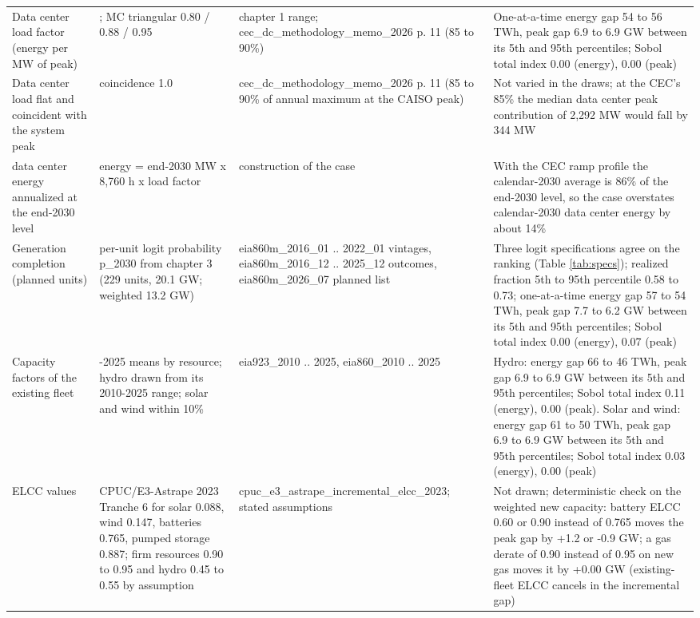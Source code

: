 \begin{longtable}{>{\raggedright\arraybackslash}p{2.3cm}>{\raggedright\arraybackslash}p{3.3cm}>{\raggedright\arraybackslash}p{2.8cm}>{\raggedright\arraybackslash}p{6.0cm}}
\addlinespace
Data center load factor (energy per MW of peak) & 0.88; MC triangular 0.80 / 0.88 / 0.95 & chapter 1 range; cec\_\allowbreak{}dc\_\allowbreak{}methodology\_\allowbreak{}memo\_\allowbreak{}2026 p. 11 (85 to 90\%) & One-at-a-time energy gap 54 to 56 TWh, peak gap 6.9 to 6.9 GW between its 5th and 95th percentiles; Sobol total index 0.00 (energy), 0.00 (peak) \\
\addlinespace
Data center load flat and coincident with the system peak & coincidence 1.0 & cec\_\allowbreak{}dc\_\allowbreak{}methodology\_\allowbreak{}memo\_\allowbreak{}2026 p. 11 (85 to 90\% of annual maximum at the CAISO peak) & Not varied in the draws; at the CEC's 85\% the median data center peak contribution of 2,292 MW would fall by 344 MW \\
\addlinespace
2030 data center energy annualized at the end-2030 level & energy = end-2030 MW x 8,760 h x load factor & construction of the case & With the CEC ramp profile the calendar-2030 average is 86\% of the end-2030 level, so the case overstates calendar-2030 data center energy by about 14\% \\
\addlinespace
Generation completion (planned units) & per-unit logit probability p\_\allowbreak{}2030 from chapter 3 (229 units, 20.1 GW; weighted 13.2 GW) & eia860m\_\allowbreak{}2016\_\allowbreak{}01 .. 2022\_\allowbreak{}01 vintages, eia860m\_\allowbreak{}2016\_\allowbreak{}12 .. 2025\_\allowbreak{}12 outcomes, eia860m\_\allowbreak{}2026\_\allowbreak{}07 planned list & Three logit specifications agree on the ranking (Table \ref{tab:specs}); realized fraction 5th to 95th percentile 0.58 to 0.73; one-at-a-time energy gap 57 to 54 TWh, peak gap 7.7 to 6.2 GW between its 5th and 95th percentiles; Sobol total index 0.00 (energy), 0.07 (peak) \\
\addlinespace
Capacity factors of the existing fleet & 2023-2025 means by resource; hydro drawn from its 2010-2025 range; solar and wind within 10\% & eia923\_\allowbreak{}2010 .. 2025, eia860\_\allowbreak{}2010 .. 2025 & Hydro: energy gap 66 to 46 TWh, peak gap 6.9 to 6.9 GW between its 5th and 95th percentiles; Sobol total index 0.11 (energy), 0.00 (peak). Solar and wind: energy gap 61 to 50 TWh, peak gap 6.9 to 6.9 GW between its 5th and 95th percentiles; Sobol total index 0.03 (energy), 0.00 (peak) \\
\addlinespace
ELCC values & CPUC/E3-Astrape 2023 Tranche 6 for solar 0.088, wind 0.147, batteries 0.765, pumped storage 0.887; firm resources 0.90 to 0.95 and hydro 0.45 to 0.55 by assumption & cpuc\_\allowbreak{}e3\_\allowbreak{}astrape\_\allowbreak{}incremental\_\allowbreak{}elcc\_\allowbreak{}2023; stated assumptions & Not drawn; deterministic check on the weighted new capacity: battery ELCC 0.60 or 0.90 instead of 0.765 moves the peak gap by +1.2 or -0.9 GW; a gas derate of 0.90 instead of 0.95 on new gas moves it by +0.00 GW (existing-fleet ELCC cancels in the incremental gap) \\

\end{longtable}
